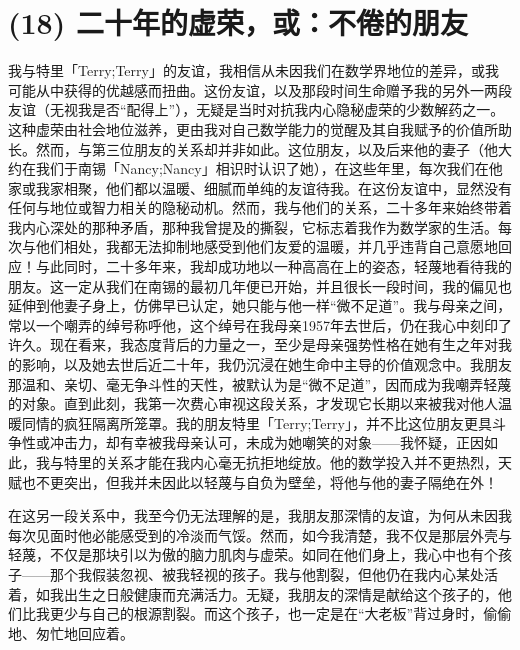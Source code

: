 \section{(18) 二十年的虚荣，或：不倦的朋友}

我与特里「Terry;Terry」的友谊，我相信从未因我们在数学界地位的差异，或我可能从中获得的优越感而扭曲。这份友谊，以及那段时间生命赠予我的另外一两段友谊（无视我是否“配得上”），无疑是当时对抗我内心隐秘虚荣的少数解药之一。这种虚荣由社会地位滋养，更由我对自己数学能力的觉醒及其自我赋予的价值所助长。然而，与第三位朋友的关系却并非如此。这位朋友，以及后来他的妻子（他大约在我们于南锡「Nancy;Nancy」相识时认识了她），在这些年里，每次我们在他家或我家相聚，他们都以温暖、细腻而单纯的友谊待我。在这份友谊中，显然没有任何与地位或智力相关的隐秘动机。然而，我与他们的关系，二十多年来始终带着我内心深处的那种矛盾，那种我曾提及的撕裂，它标志着我作为数学家的生活。每次与他们相处，我都无法抑制地感受到他们友爱的温暖，并几乎违背自己意愿地回应！与此同时，二十多年来，我却成功地以一种高高在上的姿态，轻蔑地看待我的朋友。这一定从我们在南锡的最初几年便已开始，并且很长一段时间，我的偏见也延伸到他妻子身上，仿佛早已认定，她只能与他一样“微不足道”。我与母亲之间，常以一个嘲弄的绰号称呼他，这个绰号在我母亲1957年去世后，仍在我心中刻印了许久。现在看来，我态度背后的力量之一，至少是母亲强势性格在她有生之年对我的影响，以及她去世后近二十年，我仍沉浸在她生命中主导的价值观念中。我朋友那温和、亲切、毫无争斗性的天性，被默认为是“微不足道”，因而成为我嘲弄轻蔑的对象。直到此刻，我第一次费心审视这段关系，才发现它长期以来被我对他人温暖同情的疯狂隔离所笼罩。我的朋友特里「Terry;Terry」，并不比这位朋友更具斗争性或冲击力，却有幸被我母亲认可，未成为她嘲笑的对象——我怀疑，正因如此，我与特里的关系才能在我内心毫无抗拒地绽放。他的数学投入并不更热烈，天赋也不更突出，但我并未因此以轻蔑与自负为壁垒，将他与他的妻子隔绝在外！

在这另一段关系中，我至今仍无法理解的是，我朋友那深情的友谊，为何从未因我每次见面时他必能感受到的冷淡而气馁。然而，如今我清楚，我不仅是那层外壳与轻蔑，不仅是那块引以为傲的脑力肌肉与虚荣。如同在他们身上，我心中也有个孩子——那个我假装忽视、被我轻视的孩子。我与他割裂，但他仍在我内心某处活着，如我出生之日般健康而充满活力。无疑，我朋友的深情是献给这个孩子的，他们比我更少与自己的根源割裂。而这个孩子，也一定是在“大老板”背过身时，偷偷地、匆忙地回应着。